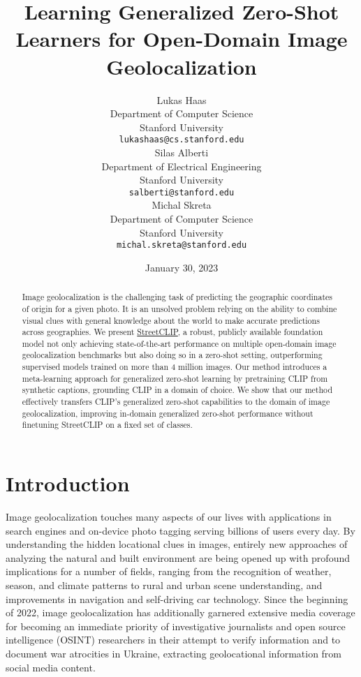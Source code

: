 \documentclass{article}
\title{Learning Generalized Zero-Shot Learners for Open-Domain Image Geolocalization}
\date{January 30, 2023}
\author{Lukas Haas\\
	Department of Computer Science\\
	Stanford University\\
	\texttt{lukashaas@cs.stanford.edu} \\
\And
	Silas Alberti\\
	Department of Electrical Engineering\\
	Stanford University\\
	\texttt{salberti@stanford.edu} \\
	\And
        Michal Skreta\\
	Department of Computer Science\\
	Stanford University\\
	\texttt{michal.skreta@stanford.edu} \\
}
\begin{document}
\maketitle

\begin{abstract}
Image geolocalization is the challenging task of predicting the geographic coordinates of origin for a given photo. It is an unsolved problem relying on the ability to combine visual clues with general knowledge about the world to make accurate predictions across geographies. We present \href{https://huggingface.co/geolocal/StreetCLIP}{StreetCLIP}, a robust, publicly available foundation model not only achieving state-of-the-art performance on multiple open-domain image geolocalization benchmarks but also doing so in a zero-shot setting, outperforming supervised models trained on more than 4 million images. Our method introduces a meta-learning approach for generalized zero-shot learning by pretraining CLIP from synthetic captions, grounding CLIP in a domain of choice. We show that our method effectively transfers CLIP's generalized zero-shot capabilities to the domain of image geolocalization, improving in-domain generalized zero-shot performance without finetuning StreetCLIP on a fixed set of classes.
\end{abstract}

\vspace{1em}


\section{Introduction}

Image geolocalization touches many aspects of our lives with applications in search engines and on-device photo tagging serving billions of users every day. By understanding the hidden locational clues in images, entirely new approaches of analyzing the natural and built environment are being opened up with profound implications for a number of fields, ranging from the recognition of weather, season, and climate patterns to rural and urban scene understanding, and improvements in navigation and self-driving car technology. Since the beginning of 2022, image geolocalization has additionally garnered extensive media coverage for becoming an immediate priority of investigative journalists and open source intelligence (OSINT) researchers in their attempt to verify information and to document war atrocities in Ukraine, extracting geolocational information from social media content.
\end{document}
